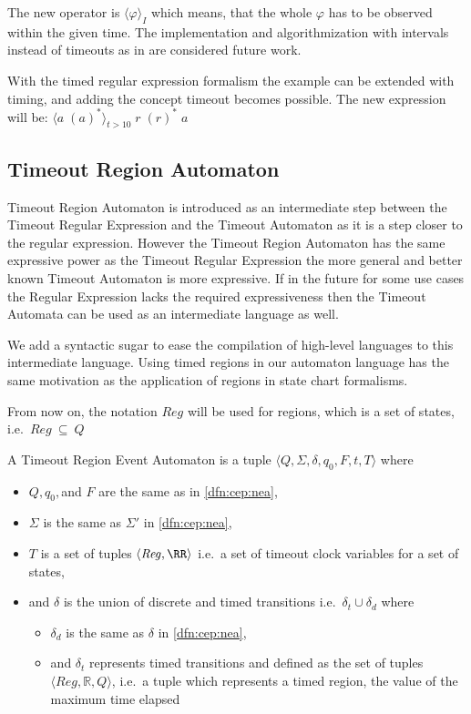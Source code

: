 	
			The new operator is $\langle \varphi \rangle_I$ which means, that the whole $\varphi$ has to be observed within the given time.	
			The implementation and algorithmization with intervals instead of timeouts as in \citep{tre} are considered future work.
	
			With the timed regular expression formalism the example can be extended with timing, and adding the concept timeout becomes possible.
			The new expression will be: $ \langle a \; (a)^\ast \rangle_{t > 10} \; r \; (r)^\ast \; a$
			
			\subsection{Timeout Region Automaton}
			
			Timeout Region Automaton is introduced as an intermediate step between the Timeout Regular Expression and the Timeout Automaton as it is a step closer to the regular expression.
			However the Timeout Region Automaton has the same expressive power as the Timeout Regular Expression the more general and better known Timeout Automaton is more expressive.
			If in the future for some use cases the Regular Expression lacks the required expressiveness then the Timeout Automata can be used as an intermediate language as well.
			
			We add a syntactic sugar to ease the compilation of high-level languages to this intermediate language.
			Using timed regions in our automaton language has the same motivation as the application of regions in state chart formalisms.
			
			From now on, the notation $\mathit{Reg}$ will be used for regions, which is a set of states, i.e.~$\mathit{Reg}~\subseteq~Q$
			
			
			\begin{dfn}
				\label{dfn:cep:trea}
				A Timeout Region Event Automaton is a tuple $\langle Q,\Sigma,\delta,q_0, F, t, T \rangle$ where
				\begin{itemize}
					\item $Q, q_0,$and $F$ are the same as in \cref{dfn:cep:nea},
					\item $\Sigma$ is the same as $\Sigma'$ in \cref{dfn:cep:nea}, 
					
					\item $T$ is a set of tuples $\langle \mathit{Reg}, \RR \rangle$ i.e.~a set of timeout clock variables for a set of states,
					\item and $\delta$ is the union of discrete and timed transitions i.e.~$\delta_t \cup \delta_d$ where
					\begin{itemize}
						\item $\delta_d$ is the same as $\delta$ in \cref{dfn:cep:nea},
						\item and $\delta_t$ represents timed transitions and defined as the set of tuples $\langle \mathit{Reg} , \mathbb{R} , Q \rangle$, i.e.~a tuple which represents a timed region, the value of the maximum time elapsed
					\end{itemize}
					
				\end{itemize}
			\end{dfn}
			
